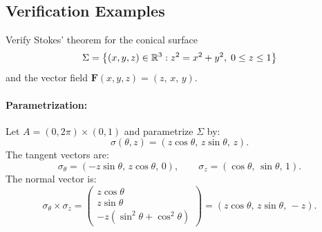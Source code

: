 \subsection{Verification Examples}

\begin{exemple}
Verify Stokes' theorem for the conical surface
\begin{equation*}
    \Sigma = \left\{ (x,y,z) \in \mathbb{R}^3 : z^2 = x^2 + y^2, \; 0 \le z \le 1 \right\}
\end{equation*}
and the vector field $\mathbf{F}(x,y,z) = (z, \, x, \, y)$.

\paragraph{Parametrization:}
Let $A = (0, 2\pi) \times (0, 1)$ and parametrize $\Sigma$ by:
\begin{equation*}
    \sigma(\theta, z) = (z \cos\theta, \, z \sin\theta, \, z).
\end{equation*}
The tangent vectors are:
\begin{equation*}
    \sigma_\theta = (-z\sin\theta, \, z\cos\theta, \, 0), \qquad \sigma_z = (\cos\theta, \, \sin\theta, \, 1).
\end{equation*}
The normal vector is:
\begin{equation*}
    \sigma_\theta \times \sigma_z = 
    \begin{pmatrix}
        z \cos\theta \\
        z \sin\theta \\
        -z(\sin^2\theta + \cos^2\theta)
    \end{pmatrix}
    = (z \cos\theta, \, z \sin\theta, \, -z).
\end{equation*}


\end{exemple}
